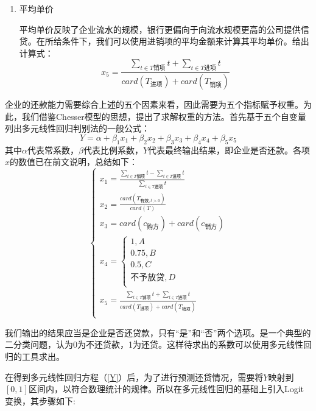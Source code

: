 \documentclass{my_paper}
\begin{document}
\begin{enumerate}
    \item 平均单价
    
    平均单价反映了企业流水的规模，银行更偏向于向流水规模更高的公司提供信贷。在所给条件下，我们可以使用进销项的平均金额来计算其平均单价。给出计算式：
    \begin{equation}
    x_5 = \frac{\sum\limits_{t\in T\text{销项}}t+\sum\limits_{t\in T\text{进项}}t}{card(T_{\text{进项}})+card(T_{\text{销项}})}
    \label{x5}
    \end{equation}

\end{enumerate}
企业的还款能力需要综合上述的五个因素来看，因此需要为五个指标赋予权重。为此，我们借鉴Chesser模型\cite{4}的思想，提出了求解权重的方法。首先基于五个自变量列出多元线性回归\cite{5}判别法的一般公式： 
\begin{equation}
Y = \alpha + \beta_1x_1 +\beta_2x_2 +\beta_3x_3 +\beta_4x_4 +\beta_5x_5 
\label{Y}
\end{equation}
其中$\alpha$代表常系数，$\beta$代表比例系数，$Y$代表最终输出结果，即企业是否还款。各项$x$的数值已在前文说明，总结如下：
$$\begin{cases}
    x_1 = \frac{\sum\limits_{t\in T\text{销项}}t-\sum\limits_{t\in T\text{进项}}t}{\sum\limits_{t\in T\text{进项}}t}\\
    x_2 = \frac{card(T_{\text{有效},t>0})}{card(T)}
        \\
        x_3 = card(c_{\text{购方}})+card(c_{\text{销方}})
    \\x_4 = \begin{cases}
        1,A\\
        0.75,B\\
        0.5,C\\
        \text{不予放贷},D\\
    \end{cases}\\
    x_5 = \frac{\sum\limits_{t\in T\text{销项}}t+\sum\limits_{t\in T\text{进项}}t}{card(T_{\text{进项}})+card(T_{\text{销项}})}
    \\
\end{cases}$$

我们输出的结果应当是企业是否还贷款，只有“是”和“否”两个选项。是一个典型的二分类问题，认为0为不还贷款，1为还贷。这样待求出的系数可以使用多元线性回归的工具求出。

在得到多元线性回归方程（\ref{Y}）后，为了进行预测还贷情况，需要将$Y$映射到$[0,1]$区间内，以符合数理统计的规律。所以在多元线性回归的基础上引入Logit变换，其步骤如下:
\end{document}
